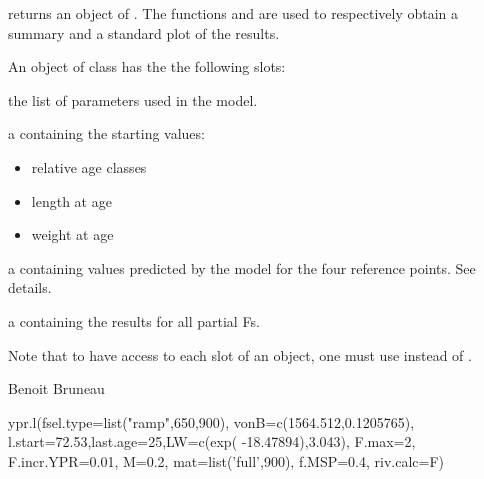 \documentclass[a4paper]{book}
\begin{document}
\begin{Value}
 returns an object of  . The functions  and  are used to respectively
obtain a summary and a standard plot of the results.  

An object of class  has the the following slots:


\begin{ldescription}
\item[\code{parms}] the list of parameters used in the model.
\item[\code{base}] a  containing the starting values:
\begin{itemize}

\item relative age classes
\item length at age
\item weight at age

\end{itemize}


\item[\code{refs}] a  containing values predicted by the model for the four reference points. See details. 
\item[\code{YPR}] a  containing the results for all partial Fs.


\end{ldescription}
Note that to have access to each slot of an  object, one must use  instead of .
\end{Value}
%
\begin{Author}\relax
Benoit Bruneau
\end{Author}
%
\begin{SeeAlso}\relax
{}
\end{SeeAlso}
%
\begin{Examples}
\begin{ExampleCode}

ypr.l(fsel.type=list("ramp",650,900), vonB=c(1564.512,0.1205765), 
      l.start=72.53,last.age=25,LW=c(exp( -18.47894),3.043), F.max=2,
      F.incr.YPR=0.01, M=0.2, mat=list('full',900), f.MSP=0.4, riv.calc=F) 

\end{ExampleCode}
\end{Examples}
\printindex{}
\end{document}
